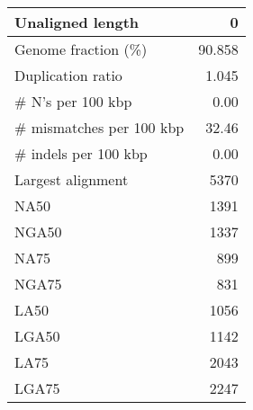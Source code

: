 \documentclass[12pt,a4paper]{article}
\begin{document}
\begin{table}[ht]
\begin{center}
\begin{tabular}{|l*{1}{|r}|}
Unaligned length & 0 \\ \hline
Genome fraction (\%) & 90.858 \\ \hline
Duplication ratio & 1.045 \\ \hline
\# N's per 100 kbp & 0.00 \\ \hline
\# mismatches per 100 kbp & 32.46 \\ \hline
\# indels per 100 kbp & 0.00 \\ \hline
Largest alignment & 5370 \\ \hline
NA50 & 1391 \\ \hline
NGA50 & 1337 \\ \hline
NA75 & 899 \\ \hline
NGA75 & 831 \\ \hline
LA50 & 1056 \\ \hline
LGA50 & 1142 \\ \hline
LA75 & 2043 \\ \hline
LGA75 & 2247 \\ \hline
\end{tabular}
\end{center}
\end{table}
\end{document}
